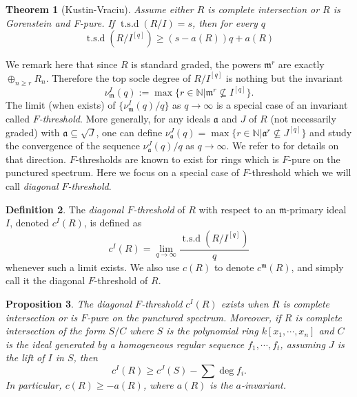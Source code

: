 \documentclass[draft]{amsart}
\newtheorem{theorem}{Theorem}[section]
\newtheorem{prop}[theorem]{Proposition}
\theoremstyle{definition}
\newtheorem{definition}[theorem]{Definition}
\numberwithin{equation}{theorem}
\begin{document}
\begin{theorem}[Kustin-Vraciu] \label{KV}
Assume either $R$ is complete intersection or $R$ is Gorenstein and F-pure. If ${\operatorname{t.s.d}} (R/I)=s$, then for every $q$
\[{\operatorname{t.s.d}} (R/I^{[q]}) \geq  (s-a(R))q+a(R)\]
\end{theorem}

We remark here that since $R$ is standard graded, the powers ${\mathfrak{m}}^r$ are exactly $\oplus_{n\geq r} R_n$. Therefore the top socle degree of $R/I^{[q]}$ is nothing but the invariant
\[\nu_{{\mathfrak{m}}}^I(q) := \max\{r\in {{\mathbb N}}| {{\mathfrak{m}}}^r \not\subseteq I^{[q]} \}.\]
The limit (when exists) of  $\{\nu_{{\mathfrak{m}}}^I(q)/q\}$ as $q \to {{\infty}}$ is a special case of an invariant called \textit{$F$-threshold}. More generally, for any ideals ${\mathfrak{a}}$ and $J$ of $R$ (not necessarily graded) with ${\mathfrak{a}} \subseteq \sqrt{J}$, one can define $\nu_{{\mathfrak{a}}}^J(q) = \max\{r\in {{\mathbb N}}| {{\mathfrak{a}}}^r \not\subseteq J^{[q]} \}$ and study the convergence of the sequence $\nu_{{\mathfrak{a}}}^J(q)/q$ as $q \to {{\infty}}$. We refer to \cite{BMS, HMTW, HTW, MTW} for details on that direction. $F$-thresholds are known to exist for rings which is $F$-pure on the punctured spectrum. Here we focus on a special case of $F$-threshold which we will call \textit{diagonal $F$-threshold}. 

\begin{definition}
The \emph{diagonal $F$-threshold} of $R$ with respect to an ${\mathfrak{m}}$-primary ideal $I$, denoted $c^I(R)$, is defined as
\[ c^I(R) =\lim_{q \to {{\infty}}} \dfrac{{\operatorname{t.s.d}} (R/I^{[q]})}{q}\]
whenever such a limit exists. We also use $c(R)$ to denote $c^{{\mathfrak{m}}}(R)$, and simply call it the diagonal $F$-threshold of $R$.
\end{definition}

\begin{prop} 
\label{TSD}
The diagonal $F$-threshold $c^I(R)$ exists when $R$ is complete intersection or is $F$-pure on the punctured spectrum. Moreover, 
if $R$ is complete intersection of the form $S/C$ where $S$ is the polynomial ring $k[x_1,\cdots, x_n]$ and $C$ is the ideal generated by a homogeneous regular sequence $f_1, \cdots, f_t$, assuming $J$ is the lift of $I$ in $S$, then  
\begin{equation}\label{lower}
c^I(R) \geq c^J(S)-\sum \deg f_i.
\end{equation}
In particular, $c(R) \geq -a(R)$, where $a(R)$ is the $a$-invariant.
\end{prop}
\end{document}
